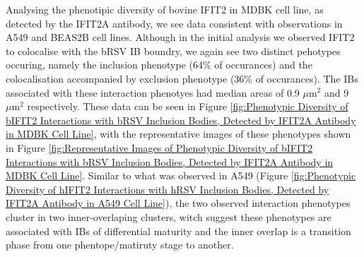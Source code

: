 Analysing the phenotipic diversity of bovine IFIT2 in MDBK cell line, as detected by the IFIT2A antibody, we see data consistent with observations in A549 and BEAS2B cell lines. Although in the initial analysis we observed IFIT2 to colocalise with the bRSV IB boundry, we again see two distinct pehotypes occuring, namely the inclusion phenotype (64\% of occurances) and the colocalisation accompanied by exclusion phenotype (36\% of occurances). The IBs associated with these interaction phenotyes had median areas of 0.9 \(\mu \mbox{m}^2\) and 9 \(\mu \mbox{m}^2\) respectively. These data can be seen in Figure \ref{fig:Phenotypic Diversity of bIFIT2 Interactions with bRSV Inclusion Bodies, Detected by IFIT2A Antibody in MDBK Cell Line}, with the representative images of these phenotypes shown in Figure \ref{fig:Representative Images of Phenotypic Diversity of bIFIT2 Interactions with bRSV Inclusion Bodies, Detected by IFIT2A Antibody in MDBK Cell Line}. Similar to what was observed in A549 (Figure \ref{fig:Phenotypic Diversity of hIFIT2 Interactions with hRSV Inclusion Bodies, Detected by IFIT2A Antibody in A549 Cell Line}), the two observed interaction phenotypes cluster in two inner-overlaping clusters, witch suggest these phenotypes are associated with IBs of differential maturity and the inner overlap is a transition phase from one phentope/matiruty stage to another.

